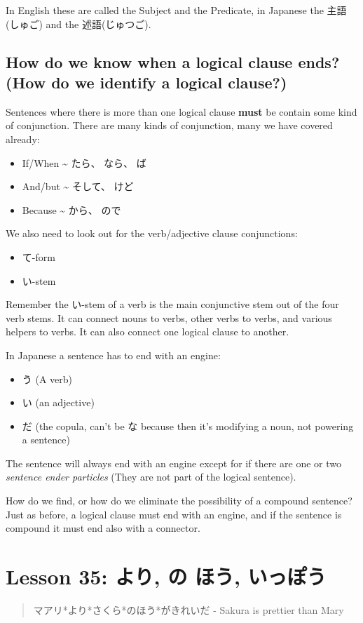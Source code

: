 \documentclass[11pt]{article}
\begin{document}
In English these are called the Subject and the Predicate, in Japanese the 主語(しゅご) and the 述語(じゅつご).

\subsection{How do we know when a logical clause ends? (How do we identify a logical clause?)}
\label{sec:org3ed0cea}
Sentences where there is more than one logical clause \textbf{must} be contain some kind of conjunction. There are many kinds of conjunction, many we have covered already:
\begin{itemize}
\item If/When \textasciitilde{} たら、 なら、 ば
\item And/but \textasciitilde{} そして、 けど
\item Because \textasciitilde{} から、 ので
\end{itemize}

We also need to look out for the verb/adjective clause conjunctions:
\begin{itemize}
\item て-form
\item い-stem
\end{itemize}

Remember the い-stem of a verb is the main conjunctive stem out of the four verb stems. It can connect nouns to verbs, other verbs to verbs, and various helpers to verbs. It can also connect one logical clause to another.

In Japanese a sentence has to end with an engine:
\begin{itemize}
\item う (A verb)
\item い (an adjective)
\item だ (the copula, can't be な because then it's modifying a noun, not powering a sentence)
\end{itemize}

The sentence will always end with an engine except for if there are one or two \emph{sentence ender particles} (They are not part of the logical sentence).

How do we find, or how do we eliminate the possibility of a compound sentence? Just as before, a logical clause must end with an engine, and if the sentence is compound it must end also with a connector.
\section{Lesson 35: より, の ほう, いっぽう}
\label{sec:org3820949}
\begin{quote}
マアリ*より*さくら*のほう*がきれいだ - Sakura is prettier than Mary
\end{quote}
\end{document}
